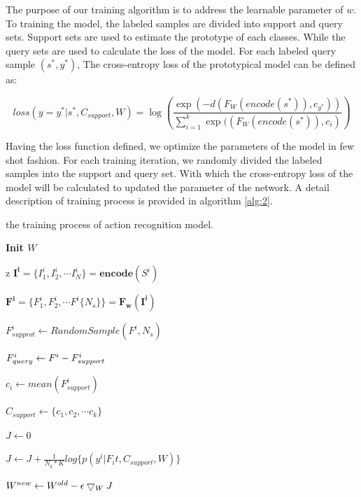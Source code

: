 \documentclass{bmvc2k}
\begin{document}
The purpose of our training algorithm is to address the learnable parameter of $w$. To training the model, the labeled samples are divided into support and query sets. Support sets are used to estimate the prototype of each classes. While the query sets are used to calculate the loss of the model. For each labeled query sample $(s^\ast,y^\ast)$, The cross-entropy loss of the prototypical model can be defined as:

$$loss(y=y^\ast | s^\ast,C_{support},W)=\log(\frac{\exp (-d(F_W(encode(s^\ast)),c_{y^\ast}))}{\sum_{i=1}^{k}\exp((F_W(encode(s^\ast)),c_i)})$$

Having the loss function defined, we optimize the parameters of the model in few shot fashion. For each training iteration, we randomly divided the labeled samples into the support and query set. With which the cross-entropy loss of the model will be calculated to updated the parameter of the network. A detail description of training process is provided in algorithm \ref{alg:2}.


\begin{algorithm}[htb]
	\caption{the training process of action recognition model.}
	\label{alg:2}
	\bf{Init $W$}

	
	\Repeat{}
	{
		{z
			$\mathbf{I^i}=\{I^i_1,I^i_2,\cdots I^i_N\}=\mathbf{encode}(S^i)$
			
			$\mathbf{F^i}=\{F^i_1,F^i_2,\cdots F^i \{ N_s \} \}=\mathbf{F_w(I^i)}$
		}	
		{
			$F^i_{supprot}\leftarrow RandomSample(F^i,N_s)$
			
			$F^i_{query}\leftarrow F^i\-- F^i_{support}$
			
			$c_i\leftarrow mean(F^i_{support})$
		}
		$C_{support}\leftarrow \{c_1,c_2,\cdots c_k\}$
		
		$J\leftarrow0$
		
		{
			{
				
				$J\leftarrow J+ \frac{1}{N_q*K}log\{p(y^i|F_it,C_{support},W)\}$
			}	
		}
		$W^{new}\leftarrow W^{old}\-- \epsilon\bigtriangledown_W J$
	}
\end{algorithm}
\end{document}
